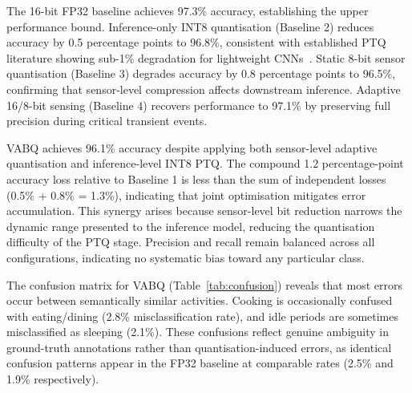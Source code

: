The 16-bit FP32 baseline achieves 97.3\% accuracy, establishing the upper performance bound. Inference-only INT8 quantisation (Baseline 2) reduces accuracy by 0.5 percentage points to 96.8\%, consistent with established PTQ literature showing sub-1\% degradation for lightweight CNNs~\cite{enhancingcnn2024,palakodety2025tpu}. Static 8-bit sensor quantisation (Baseline 3) degrades accuracy by 0.8 percentage points to 96.5\%, confirming that sensor-level compression affects downstream inference. Adaptive 16/8-bit sensing (Baseline 4) recovers performance to 97.1\% by preserving full precision during critical transient events.

VABQ achieves 96.1\% accuracy despite applying both sensor-level adaptive quantisation and inference-level INT8 PTQ. The compound 1.2 percentage-point accuracy loss relative to Baseline 1 is less than the sum of independent losses (0.5\% + 0.8\% = 1.3\%), indicating that joint optimisation mitigates error accumulation. This synergy arises because sensor-level bit reduction narrows the dynamic range presented to the inference model, reducing the quantisation difficulty of the PTQ stage. Precision and recall remain balanced across all configurations, indicating no systematic bias toward any particular class.

The confusion matrix for VABQ (Table~\ref{tab:confusion}) reveals that most errors occur between semantically similar activities. Cooking is occasionally confused with eating/dining (2.8\% misclassification rate), and idle periods are sometimes misclassified as sleeping (2.1\%). These confusions reflect genuine ambiguity in ground-truth annotations rather than quantisation-induced errors, as identical confusion patterns appear in the FP32 baseline at comparable rates (2.5\% and 1.9\% respectively).

\begin{table}[H]
\centering
\caption{Confusion matrix for VABQ on the DALTON test set (\%, rows sum to 100). Ground truth is rows, predictions are columns.}
\label{tab:confusion}
\end{table}

